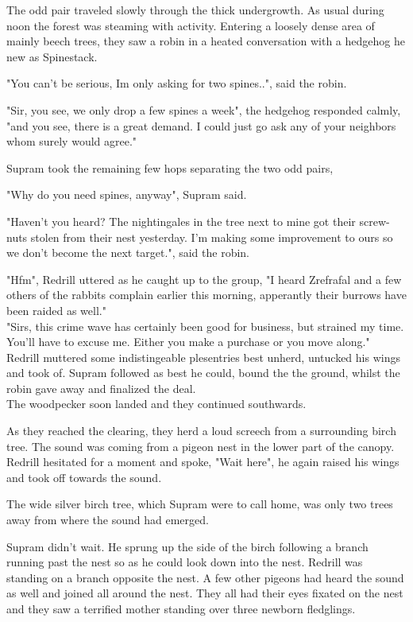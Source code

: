 \documentclass[smalldemyvopaper,11pt,twoside,onecolumn,openright,extrafontsizes]{memoir}
\newlength\drop
\begin{document}
The odd pair traveled slowly through the thick undergrowth. As usual during noon the forest was steaming with activity.
Entering a loosely dense area of mainly beech trees, they saw a robin in a heated conversation with a hedgehog he new as Spinestack.

"You can't be serious, Im only asking for two spines..", said the robin.

"Sir, you see, we only drop a few spines a week", the hedgehog responded calmly, "and you see, there is a great demand. I could just go ask any of your neighbors whom surely would agree."

Supram took the remaining few hops separating the two odd pairs,

"Why do you need spines, anyway", Supram said.

"Haven't you heard? The nightingales in the tree next to mine got their screw-nuts stolen from their nest yesterday. I'm making some improvement to ours so we don't become the next target.", said the robin.

"Hfm", Redrill uttered as he caught up to the group, "I heard Zrefrafal and a few others of the rabbits complain earlier this morning, apperantly their burrows have been raided as well."\\

"Sirs, this crime wave has certainly been good for business, but strained my time. You'll have to excuse me. Either you make a purchase or you move along."\\

Redrill muttered some indistingeable plesentries best unherd, untucked his wings and took of. Supram followed as best he could, bound the the ground, whilst the robin gave away and finalized the deal.\\

The woodpecker soon landed and they continued southwards. 

As they reached the clearing, they herd a loud screech from a surrounding birch tree. The sound was coming from a pigeon nest in the lower part of the canopy. Redrill hesitated for a moment and spoke, "Wait here", he again raised his wings and took off towards the sound. 

The wide silver birch tree, which Supram were to call home, was only two trees away from where the sound had emerged.

Supram didn't wait. He sprung up the side of the birch following a branch running past the nest so as he could look down into the nest. Redrill was standing on a branch opposite the nest. A few other pigeons had heard the sound as well and joined all around the nest. They all had their eyes fixated on the nest and they saw a terrified mother standing over three newborn fledglings.\\
\end{document}
